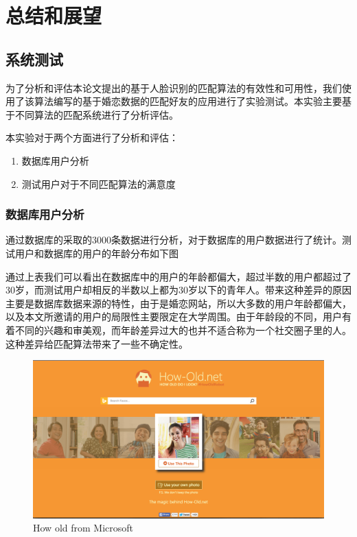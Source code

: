 
\chapter{总结和展望}
\section{系统测试}
为了分析和评估本论文提出的基于人脸识别的匹配算法的有效性和可用性，我们使用了该算法编写的基于婚恋数据的匹配好友的应用进行了实验测试。本实验主要基于不同算法的匹配系统进行了分析评估。

本实验对于两个方面进行了分析和评估：
\begin{enumerate}
\item 数据库用户分析
\item 测试用户对于不同匹配算法的满意度
\end{enumerate}
\subsection{数据库用户分析}
通过数据库的采取的3000条数据进行分析，对于数据库的用户数据进行了统计。测试用户和数据库的用户的年龄分布如下图


通过上表我们可以看出在数据库中的用户的年龄都偏大，超过半数的用户都超过了30岁，而测试用户却相反的半数以上都为30岁以下的青年人。带来这种差异的原因主要是数据库数据来源的特性，由于是婚恋网站，所以大多数的用户年龄都偏大，以及本文所邀请的用户的局限性主要限定在大学周围。由于年龄段的不同，用户有着不同的兴趣和审美观，而年龄差异过大的也并不适合称为一个社交圈子里的人。这种差异给匹配算法带来了一些不确定性。

\begin{figure}[h]
\centering
\includegraphics[width=\textwidth]{img/chap5/how_old.png}
\caption{How old from Microsoft\label{Face++API}}
\end{figure}


